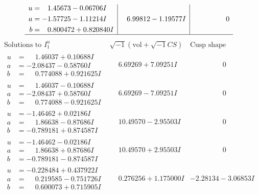 \documentclass[1p]{elsarticle_modified}
\theoremstyle{definition}
\newcommand{\I}{\sqrt{-1}}
\begin{document}
$$\begin{array}{c|c|c}
\begin{aligned}
u &= \phantom{-}1.45673 - 0.06706 I \\
a &= -1.57725 - 1.11214 I \\
b &= \phantom{-}0.800472 + 0.820840 I\end{aligned}
 & \phantom{-}6.99812 - 1.19577 I & \phantom{-0.000000 } 0\\
 \hline 
 \end{array}$$\newpage$$\begin{array}{c|c|c}  
\text{Solutions to }I^u_{1}& \I (\text{vol} + \sqrt{-1}CS) & \text{Cusp shape}\\
 \hline 
\begin{aligned}
u &= \phantom{-}1.46037 + 0.10688 I \\
a &= -2.08437 - 0.58760 I \\
b &= \phantom{-}0.774088 + 0.921625 I\end{aligned}
 & \phantom{-}6.69269 + 7.09251 I & \phantom{-0.000000 } 0 \\ \hline\begin{aligned}
u &= \phantom{-}1.46037 - 0.10688 I \\
a &= -2.08437 + 0.58760 I \\
b &= \phantom{-}0.774088 - 0.921625 I\end{aligned}
 & \phantom{-}6.69269 - 7.09251 I & \phantom{-0.000000 } 0 \\ \hline\begin{aligned}
u &= -1.46462 + 0.02186 I \\
a &= \phantom{-}1.86638 - 0.87686 I \\
b &= -0.789181 + 0.874587 I\end{aligned}
 & \phantom{-}10.49570 - 2.95503 I & \phantom{-0.000000 } 0 \\ \hline\begin{aligned}
u &= -1.46462 - 0.02186 I \\
a &= \phantom{-}1.86638 + 0.87686 I \\
b &= -0.789181 - 0.874587 I\end{aligned}
 & \phantom{-}10.49570 + 2.95503 I & \phantom{-0.000000 } 0 \\ \hline\begin{aligned}
u &= -0.228484 + 0.437922 I \\
a &= \phantom{-}0.219585 - 0.751726 I \\
b &= \phantom{-}0.600073 + 0.715905 I\end{aligned}
 & \phantom{-}0.276256 + 1.175000 I & -2.28134 - 3.06853 I \\ \hline\begin{aligned}

\end{aligned}
\end{array}$$
\end{document}
